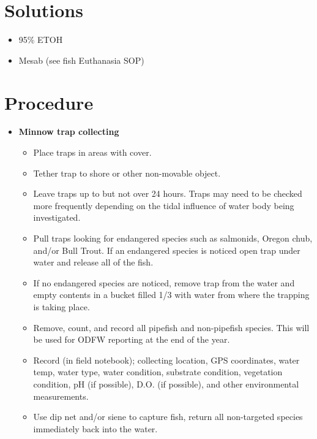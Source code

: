 \documentclass[
  letterpaper,
  DIV=11,
  numbers=noendperiod]{scrreprt}
\providecommand{\tightlist}{%
  \setlength{\itemsep}{0pt}\setlength{\parskip}{0pt}}\usepackage{longtable,booktabs,array}
\begin{document}
\hypertarget{solutions-54}{%
\section{Solutions}\label{solutions-54}}

\begin{itemize}
\tightlist
\item
  95\% ETOH
\item
  Mesab (see fish Euthanasia SOP)
\end{itemize}

\hypertarget{procedure-61}{%
\section{Procedure}\label{procedure-61}}

\begin{itemize}
\tightlist
\item
  \textbf{Minnow trap collecting}

  \begin{itemize}
  \tightlist
  \item
    Place traps in areas with cover.
  \item
    Tether trap to shore or other non-movable object.
  \item
    Leave traps up to but not over 24 hours. Traps may need to be
    checked more frequently depending on the tidal influence of water
    body being investigated.
  \item
    Pull traps looking for endangered species such as salmonids, Oregon
    chub, and/or Bull Trout. If an endangered species is noticed open
    trap under water and release all of the fish.
  \item
    If no endangered species are noticed, remove trap from the water and
    empty contents in a bucket filled 1/3 with water from where the
    trapping is taking place.
  \item
    Remove, count, and record all pipefish and non-pipefish species.
    This will be used for ODFW reporting at the end of the year.
  \item
    Record (in field notebook); collecting location, GPS coordinates,
    water temp, water type, water condition, substrate condition,
    vegetation condition, pH (if possible), D.O. (if possible), and
    other environmental measurements.
  \item
    Use dip net and/or siene to capture fish, return all non-targeted
    species immediately back into the water.
  \end{itemize}
\end{itemize}
\end{document}
